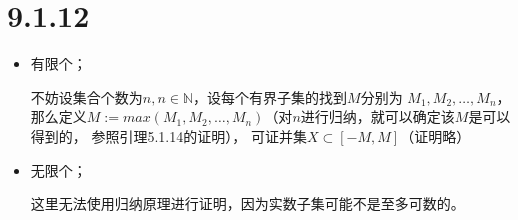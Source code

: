 \documentclass{article}
\begin{document}
\section*{9.1.12}

\begin{itemize}
      \item 有限个；

            不妨设集合个数为$n, n \in \mathbb{N}$，设每个有界子集的找到$M$分别为
            $M_1, M_2, \dots, M_n$，
            那么定义$M := max(M_1, M_2, \dots, M_n)$（对$n$进行归纳，就可以确定该$M$是可以得到的，
            参照引理5.1.14的证明），
            可证并集$X \subset [-M, M]$（证明略）

      \item 无限个；

            这里无法使用归纳原理进行证明，因为实数子集可能不是至多可数的。





\end{itemize}
\end{document}
